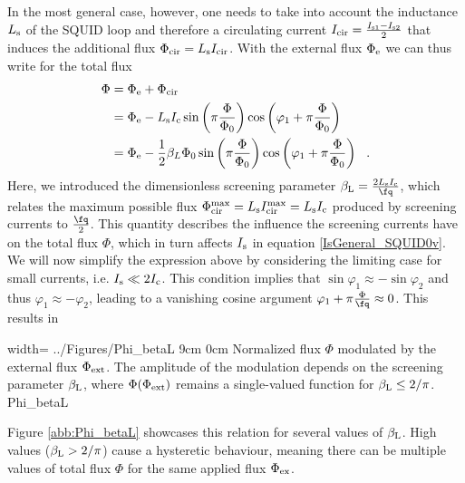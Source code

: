 In the most general case, however, one needs to take into account the inductance $L_{\rm s}$ of the SQUID loop and therefore a circulating current $I_{\rm cir} = \frac{I_{\rm s1} - I_{\rm s2}}{2}$ that induces the additional flux $\Phi_{\rm cir} = L_{\rm s}I_{\rm cir}$. With the external flux $\Phi_{\rm e}$ we can thus write for the total flux
\begin{align}
	\Phi &= \Phi_{\rm e} + \Phi_{\rm cir} \\ &= \Phi_{\rm e} - L_{\rm s} I_{\rm  c} \sin \left(\pi \frac{\Phi}{\Phi_0}\right) \cos \left(\varphi_1+\pi \frac{\Phi}{\Phi_0}\right) \\ &= \Phi_{\mathrm{e}}-\frac{1}{2} \beta_L \Phi_0 \sin \left(\pi \frac{\Phi}{\Phi_0}\right) \cos \left(\varphi_1+\pi \frac{\Phi}{\Phi_0}\right) \ \ .
\end{align}
Here, we introduced the dimensionless screening parameter $\beta_{\rm L}=\frac{2L_{\rm s}I_{\rm c}}{\unit{\fq}}$, which relates the maximum possible flux $\Phi_{\rm cir}^{\rm max} = L_{\rm s}I_{\rm cir}^{\rm max} = L_{\rm s}I_{\rm c}$ produced by screening currents to $\frac{\unit{\fq}}{2}$. This quantity describes the influence the screening currents have on the total flux $\Phi$, which in turn affects $I_{\rm s}$ in equation \ref{IsGeneral_SQUID0v}. We will now simplify the expression above by considering the limiting case for small currents, i.e. $I_{\rm s}\ll 2I_{\rm c}$. This condition implies that $\sin\varphi_1\approx -  \sin\varphi_2$ and thus $\varphi_1\approx - \varphi_2$, leading to a vanishing cosine argument $\varphi_1 + \pi\frac{\Phi}{\unit{\fq}} \approx 0$. This results in



{width=\textwidth}
{../Figures/Phi_betaL}
{9cm}
{0cm}
{Normalized flux $\Phi$ modulated by the external flux $\Phi_{\rm ext}$. The amplitude of the modulation depends on the screening parameter $\beta_{\rm L}$, where $\Phi(\Phi_{\rm ext})$ remains a single-valued function for $\beta_{\rm L}\leq2/\pi$.} 
{Phi_betaL}

Figure \ref{abb:Phi_betaL} showcases this relation for several values of $\beta_{\rm L}$. High values ($\beta_{\rm L}>2/\pi$) cause a hysteretic behaviour, meaning there can be multiple values of total flux $\Phi$ for the same applied flux $\Phi_{\rm ex}$.  


